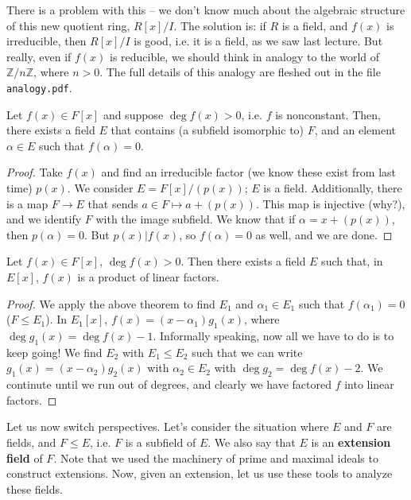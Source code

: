 \documentclass{../mathnotes}
\begin{document}
There is a problem with this -- we don't know much about the algebraic structure of this new quotient ring, $R[x]/I$.
The solution is: if $R$ is a field, and $f(x)$ is irreducible, then $R[x]/I$ is good, i.e. it is a field, as we
saw last lecture. But really, even if $f(x)$ is reducible, we should think in analogy to the world of
$\mathbb{Z}/n\mathbb{Z}$, where $n>0$. The full details of this analogy are fleshed out in the file \texttt{analogy.pdf}.

\begin{thm}
    Let $f(x)\in F[x]$ and suppose $\deg f(x)>0$, i.e. $f$ is nonconstant. Then, there exists a field $E$ that
    contains (a subfield isomorphic to) $F$, and an element $\alpha\in E$ such that $f(\alpha)=0$.
\end{thm}
\begin{proof}
    Take $f(x)$ and find an irreducible factor (we know these exist from last time) $p(x)$. We consider $E=F[x]/(p(x))$;
    $E$ is a field. Additionally, there is a map $F\to E$ that sends $a\in F\mapsto a+(p(x))$. This map is injective (why?),
    and we identify $F$ with the image subfield. We know that if $\alpha=x+(p(x))$, then $p(\alpha)=0$. But
    $p(x)|f(x)$, so $f(\alpha)=0$ as well, and we are done.
\end{proof}

\begin{cor}
    Let $f(x)\in F[x]$, $\deg f(x)>0$. Then there exists a field $E$ such that, in $E[x]$, $f(x)$ is a product
    of linear factors.
\end{cor}
\begin{proof}
    We apply the above theorem to find $E_1$ and $\alpha_1\in E_1$ such that $f(\alpha_1)=0$ ($F\leq E_1$).
    In $E_1[x]$, $f(x)=(x-\alpha_1)g_1(x)$, where $\deg g_1(x)=\deg f(x)-1$. Informally speaking, now all we have to do
    is to keep going! We find $E_2$ with $E_1\leq E_2$ such that we can write $g_1(x)=(x-\alpha_2)g_2(x)$ with $\alpha_2\in E_2$ with
    $\deg g_2=\deg f(x)-2$. We continute until we run out of degrees, and clearly we have factored $f$ into linear factors.
\end{proof}

Let us now switch perspectives. Let's consider the situation where $E$ and $F$ are fields, and $F\leq E$, i.e. $F$ is a subfield
of $E$. We also say that $E$ is an \textbf{extension field} of $F$. Note that we used the machinery of prime and maximal ideals to
construct extensions. Now, given an extension, let us use these tools to analyze these fields.
\end{document}
